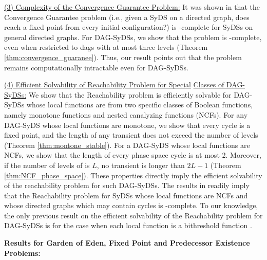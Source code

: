 \smallskip

\noindent
\underline{(3) Complexity of the Convergence Guarantee Problem:}
It was shown in \cite{Chistikov-etal-2020} that
the Convergence Guarantee problem 
(i.e., given a SyDS \cals{} on
a directed graph, does \cals{} reach a fixed point from every
initial configuration?)  
is \cpsp-complete for SyDSs on general directed graphs.
For DAG-SyDSs, we show that the problem is \cconp-complete,
even when restricted to dags with at most  three levels 
(Theorem \ref{thm:convergence_guaranee}).
Thus, our result points out that the problem remains 
computationally intractable even for DAG-SyDSs.

\smallskip

\noindent
\underline{(4) Efficient Solvability of Reachability Problem for Special}\newline
\underline{Classes of DAG-SyDSs:} 
We show that the Reachability problem is efficiently solvable for
DAG-SyDSs whose local functions are from two specific
classes of Boolean functions, namely monotone functions and
nested canalyzing functions (NCFs).
For any DAG-SyDS whose local functions are monotone,
we show that every cycle is a fixed point, 
and the length of any transient does not exceed the number of levels
(Theorem \ref{thm:montone_stable}).
For a DAG-SyDS \cals{} whose local functions are NCFs, we show
that the length of every phase space cycle is at most 2.
Moreover, if the number of levels of  \cals{} is $L$,
no transient is longer than $2L-1$
(Theorem \ref{thm:NCF_phase_space}).
These properties
directly imply the efficient solvability of the reachability
problem for such DAG-SyDSs.
The results in \cite{Rosenkrantz-etal-2018} readily imply
that the Reachability problem for SyDSs whose local
functions are NCFs and whose directed graphs which may contain cycles  
is \cpsp-complete.
To our knowledge, the only previous result on the efficient
solvability of the  Reachability problem for DAG-SyDSs is
for the case when each local function is a bithreshold
function \cite{KKM+2013}.


\iffalse
\item \textbf{Results for Garden of Eden, Fixed Point and Predecessor Existence
Problems:}

